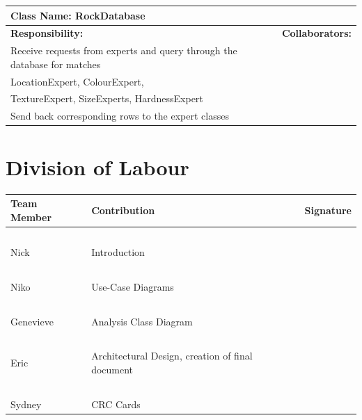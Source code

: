 \documentclass[titlepage]{article}
\begin{document}
\begin{table}[!ht]
	\centering
	\begin{tabular}{| p{4cm} | c |} \hline 
		\multicolumn{2}{|l|}{\textbf{Class Name: RockDatabase}} \\ \hline
		\textbf{Responsibility:} & \textbf{Collaborators:} \\ \hline
		Receive requests from experts and query through the database for matches & \pbox{15cm}{~\\LocationExpert, ColourExpert,\\TextureExpert, SizeExperts, HardnessExpert}\\ \hline
		Send back corresponding rows to the expert classes & \\ \hline
	\end{tabular}
\end{table}
\vfill


\newpage
\appendix
\section{Division of Labour}
\begin{center}
\begin{tabular}[!htbp]{| p{6cm} | p{6cm} | p{4cm} |} \hline
	\textbf{Team Member}	&\textbf{Contribution} 						& \textbf{Signature}	\\ \hline
	~					&~										&				\\
	Nick					&Introduction								&				\\ \hline
	~					&~										&				\\
	Niko					&Use-Case Diagrams						&				\\ \hline
	~					&										&				\\
	Genevieve			&Analysis Class Diagram						&				\\ \hline
	~					&										&				\\
	Eric					&Architectural Design, creation of final document	&				\\ \hline
	~					&										&				\\
	Sydney				&CRC Cards								&				\\ \hline
\end{tabular}
\end{center}
\end{document}

